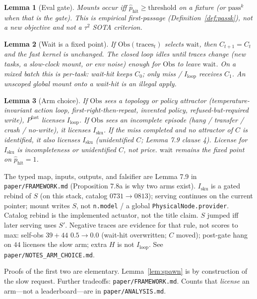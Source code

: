 \documentclass{article}
\newtheorem{lemma}{Lemma}
\begin{document}
\begin{lemma}[Eval gate]
Mounts occur iff \(\hat p_{\mathrm{hit}}\ge\mathrm{threshold}\) on a fixture (or \(\mathrm{pass}^k\) when that is the gate). This is empirical first-passage (Definition~\ref{def:passk}), not a new objective and not a \(\tau^2\) SOTA criterion.
\end{lemma}

\begin{lemma}[Wait is a fixed point]
If \(\mathrm{Obs}(\mathrm{traces}_t)\) selects \(\mathrm{wait}\), then \(C_{t+1}=C_t\) and the fast kernel is unchanged. The closed loop idles until traces change (new tasks, a slow-clock mount, or env noise) enough for \(\mathrm{Obs}\) to leave \(\mathrm{wait}\). On a mixed batch this is per-task: wait-hit keeps \(C_0\); only miss / \(I_{\mathrm{loop}}\) receives \(C_1\). An unscoped global mount onto a wait-hit is an illegal apply.
\end{lemma}

\begin{lemma}[Arm choice]
If \(\mathrm{Obs}\) sees a topology or policy attractor (temperature-invariant action loop, first-right-then-repeat, invented policy, refused-but-required write), \(P^{\mathrm{fast}}\) licenses \(I_{\mathrm{loop}}\). If \(\mathrm{Obs}\) sees an incomplete episode (hang / transfer / crash / no-write), it licenses \(I_{\mathrm{sku}}\). If the miss completed and no attractor of \(C\) is identified, it also licenses \(I_{\mathrm{sku}}\) (unidentified \(C\); Lemma 7.9 clause 4). License for \(I_{\mathrm{sku}}\) is incompleteness or unidentified \(C\), not price. \(\mathrm{wait}\) remains the fixed point on \(\hat p_{\mathrm{hit}}=1\).
\end{lemma}

The typed map, inputs, outputs, and falsifier are Lemma 7.9 in \texttt{paper/FRAMEWORK.md} (Proposition 7.8a is why two arms exist). \(I_{\mathrm{sku}}\) is a gated rebind of \(S\) (on this stack, catalog \(0731\to 0813\)); serving continues on the current pointer; mount writes \(S\), not \texttt{n.model} / a global \texttt{PhysicalNode.provider}. Catalog rebind is the implemented actuator, not the title claim. \(S\) jumped iff later serving uses \(S'\). Negative traces are evidence for that rule, not scores to max: self-obs \(39+44\) \(0.5\to 0.0\) (wait-hit overwritten; \(C\) moved); post-gate hang on \(44\) licenses the slow arm; extra \(H\) is not \(I_{\mathrm{loop}}\). See \texttt{paper/NOTES\_ARM\_CHOICE.md}.

Proofs of the first two are elementary. Lemma~\ref{lem:spawn} is by construction of the slow request. Further tradeoffs: \texttt{paper/FRAMEWORK.md}. Counts that \emph{license} an arm---not a leaderboard---are in \texttt{paper/ANALYSIS.md}.
\end{document}
